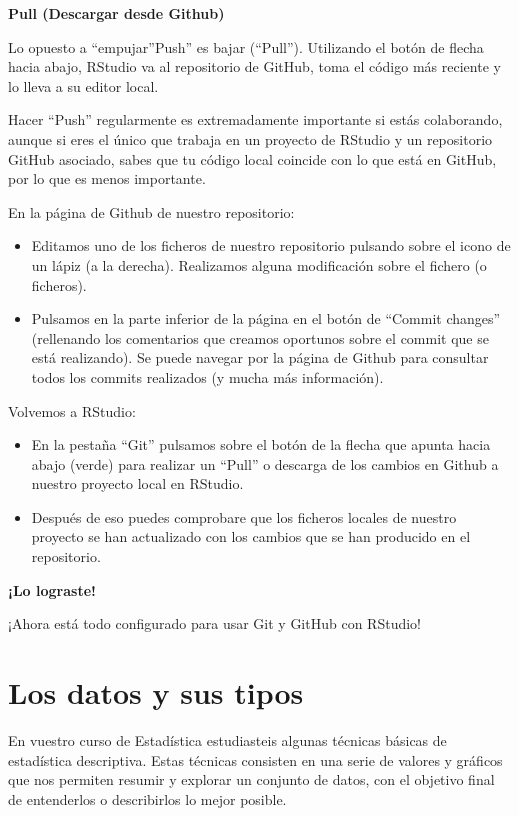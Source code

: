\documentclass[
  letterpaper,
  DIV=11,
  numbers=noendperiod]{scrreprt}
\begin{document}
\textbf{Pull (Descargar desde Github)}

Lo opuesto a ``empujar''Push'' es bajar (``Pull''). Utilizando el botón
de flecha hacia abajo, RStudio va al repositorio de GitHub, toma el
código más reciente y lo lleva a su editor local.

Hacer ``Push'' regularmente es extremadamente importante si estás
colaborando, aunque si eres el único que trabaja en un proyecto de
RStudio y un repositorio GitHub asociado, sabes que tu código local
coincide con lo que está en GitHub, por lo que es menos importante.

En la página de Github de nuestro repositorio:

\begin{itemize}
\item
  Editamos uno de los ficheros de nuestro repositorio pulsando sobre el
  icono de un lápiz (a la derecha). Realizamos alguna modificación sobre
  el fichero (o ficheros).
\item
  Pulsamos en la parte inferior de la página en el botón de ``Commit
  changes'' (rellenando los comentarios que creamos oportunos sobre el
  commit que se está realizando). Se puede navegar por la página de
  Github para consultar todos los commits realizados (y mucha más
  información).
\end{itemize}

Volvemos a RStudio:

\begin{itemize}
\item
  En la pestaña ``Git'' pulsamos sobre el botón de la flecha que apunta
  hacia abajo (verde) para realizar un ``Pull'' o descarga de los
  cambios en Github a nuestro proyecto local en RStudio.
\item
  Después de eso puedes comprobare que los ficheros locales de nuestro
  proyecto se han actualizado con los cambios que se han producido en el
  repositorio.
\end{itemize}

\textbf{¡Lo lograste!}

¡Ahora está todo configurado para usar Git y GitHub con RStudio!

\section{Los datos y sus tipos}\label{los-datos-y-sus-tipos}

En vuestro curso de Estadística estudiasteis algunas técnicas básicas de
estadística descriptiva. Estas técnicas consisten en una serie de
valores y gráficos que nos permiten resumir y explorar un conjunto de
datos, con el objetivo final de entenderlos o describirlos lo mejor
posible.
\end{document}
